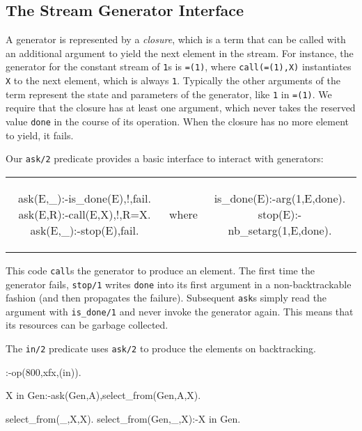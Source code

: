 \documentclass{new_tlp}
\begin{document}
\subsection{The Stream Generator Interface}

A generator is represented by a \emph{closure}, which is a term that can be
called with an additional argument to yield the next element in the stream. For
instance, the generator for the constant stream of \texttt{1}s is
\texttt{=(1)}, where \texttt{call(=(1),X)} instantiates \texttt{X} to the next
element, which is always \texttt{1}.  Typically the other arguments of the term
represent the state and parameters of the generator, like \texttt{1} in
\texttt{=(1)}. We require that the closure has at least one argument, which
never takes the reserved value \texttt{done} in the course of its operation.
When the closure has no more element to yield, it fails.

Our {\tt ask/2} predicate provides a basic interface to interact with generators:\\
\begin{tabular}{ccc}
\begin{minipage}{0.4\textwidth}
\begin{code}
ask(E,_):-is_done(E),!,fail.
ask(E,R):-call(E,X),!,R=X.
ask(E,_):-stop(E),fail.
\end{code}
\end{minipage}
&
where
&
\begin{minipage}{0.4\textwidth}
\begin{code}
is_done(E):-arg(1,E,done).
stop(E):-nb_setarg(1,E,done).
\end{code}
\end{minipage}
\end{tabular}
This code {\tt call}s the generator to produce an element. The first time the
generator fails, \texttt{stop/1} writes \texttt{done} into its first argument
in a non-backtrackable fashion (and then propagates the failure). Subsequent 
{\tt ask}s simply read the argument with \texttt{is\_done/1} and never invoke
the generator again. This means that its resources can be garbage collected.

The {\tt in/2} predicate uses {\tt ask/2} to produce the elements on backtracking.
\begin{code}
:-op(800,xfx,(in)).

X in Gen:-ask(Gen,A),select_from(Gen,A,X).

select_from(_,X,X).
select_from(Gen,_,X):-X in Gen.
\end{code}
\end{document}
